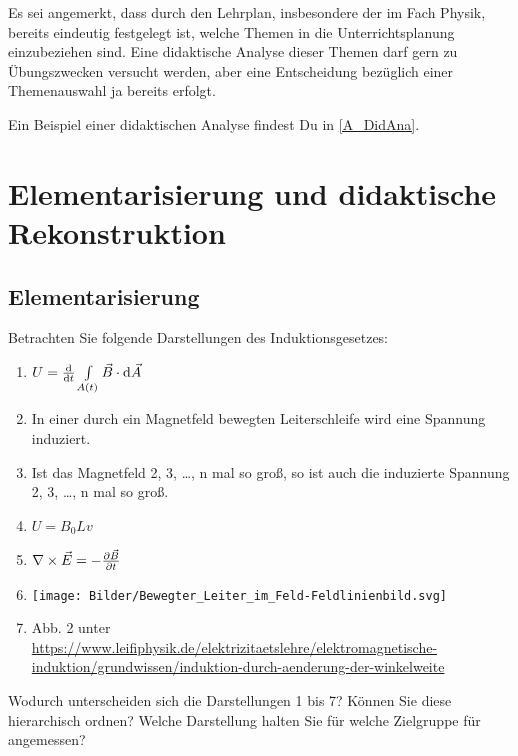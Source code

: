 \bip

Es sei angemerkt, dass durch den Lehrplan, insbesondere der im Fach Physik, bereits eindeutig festgelegt ist, welche Themen in die Unterrichtsplanung einzubeziehen sind. Eine didaktische Analyse dieser Themen darf gern zu \"{U}bungszwecken versucht werden, aber eine Entscheidung bez\"{u}glich einer Themenauswahl ja bereits erfolgt.

Ein Beispiel einer didaktischen Analyse findest Du in \cref{A_DidAna}.

\section{Elementarisierung und didaktische Rekonstruktion}


\subsection{Elementarisierung}\label{Elementarisierung}

\begin{uea}
	Betrachten Sie folgende Darstellungen des Induktionsgesetzes:
	\begin{enumerate}
		\item $U = \dv{t} \int\limits_{A(t)} \vec{B}\cdot \dd{\vec{A}}$
		\item In einer durch ein Magnetfeld bewegten Leiterschleife wird eine Spannung induziert.
		\item Ist das Magnetfeld 2, 3, \dots, n mal so groß, so ist auch die induzierte Spannung 2, 3, \dots, n mal so groß.
		\item $U=B_0 L v$
		\item $\nabla\times\vec{E} = - \pdv{\vec{B}}{t}$
		\item \texttt{[image: Bilder/Bewegter\_Leiter\_im\_Feld-Feldlinienbild.svg]}
		\item Abb. 2 unter \url{https://www.leifiphysik.de/elektrizitaetslehre/elektromagnetische-induktion/grundwissen/induktion-durch-aenderung-der-winkelweite}
	\end{enumerate}
	Wodurch unterscheiden sich die Darstellungen 1 bis 7? Können Sie diese hierarchisch ordnen? Welche Darstellung halten Sie für welche Zielgruppe für angemessen?
\end{uea}

